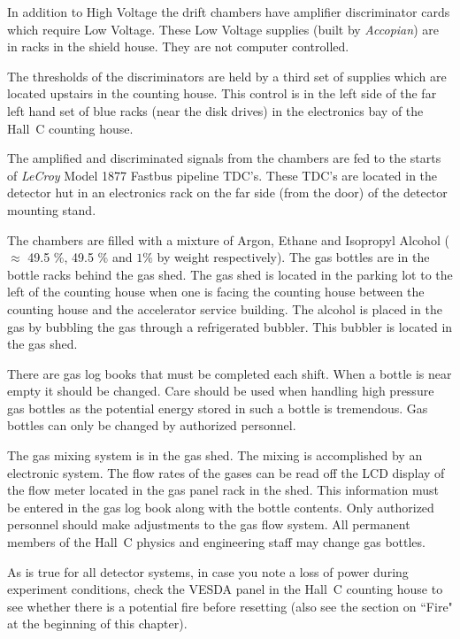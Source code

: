 In addition to High Voltage the drift chambers have amplifier discriminator
cards which require Low Voltage. These Low Voltage supplies
(built by {\em Accopian}) are
in racks in the shield house. They are not computer controlled.

The thresholds of the discriminators are held by a third set of supplies
which are located upstairs in the counting house. This control
is in the left side of the far left hand set of blue racks (near the disk drives) in the
electronics bay of the Hall~C counting house.

The amplified and discriminated signals from the chambers are fed
to the starts of {\em LeCroy} Model 1877 Fastbus pipeline TDC's. These
TDC's are located in the detector hut in an electronics rack on the
far side (from the door) of the detector mounting stand.

The chambers are filled with a mixture of Argon, Ethane and Isopropyl Alcohol
($\approx$ 49.5 $\%$, 49.5 $\%$  and $1\%$ by weight respectively).
The gas bottles are in the bottle racks behind the gas shed. The gas shed
is located in the parking lot to the left of the counting house when one is facing the counting
house between the counting house and the accelerator
service building.  The alcohol is placed in the gas
by bubbling the gas through a refrigerated bubbler. This bubbler is
located in the gas shed.

There are gas log books that must be completed each shift.
When a bottle is near empty it should be changed.
Care should be used when handling high pressure gas bottles as the
potential energy stored in such a bottle is tremendous.
Gas bottles can only be changed by authorized personnel.

The gas mixing system is in the gas shed. The mixing is accomplished
by an electronic system. The flow rates of the gases can be read off the
LCD display of the flow meter located in the gas panel rack in the shed.
This information must be entered in the gas log book along with the bottle contents.
Only authorized personnel should make adjustments to the gas flow system.
All permanent members
of the Hall~C physics and engineering staff may change gas bottles.

As is true for all detector systems, in case you note a loss of power
during experiment conditions, check the VESDA panel in the Hall~C counting
house to see whether there is a potential fire before resetting (also
see the section on ``Fire" at the beginning of this chapter).

